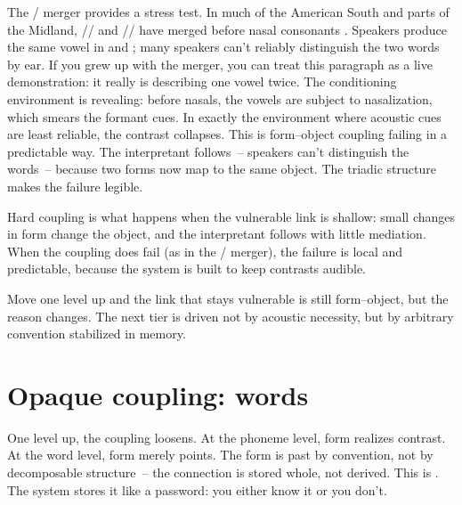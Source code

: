 The / merger provides a stress test. In much of the American South and parts of the Midland, // and // have merged before nasal consonants \parencite{labov2006}. Speakers produce the same vowel in  and ; many speakers can't reliably distinguish the two words by ear. If you grew up with the merger, you can treat this paragraph as a live demonstration: it really is describing one vowel twice. The conditioning environment is revealing: before nasals, the vowels are subject to nasalization, which smears the formant cues. In exactly the environment where acoustic cues are least reliable, the contrast collapses. This is form--object coupling failing in a predictable way. The interpretant follows~-- speakers can't distinguish the words~-- because two forms now map to the same object. The triadic structure makes the failure legible.

Hard coupling is what happens when the vulnerable link is shallow: small changes in form change the object, and the interpretant follows with little mediation. When the coupling does fail (as in the / merger), the failure is local and predictable, because the system is built to keep contrasts audible.

Move one level up and the link that stays vulnerable is still form--object, but the reason changes. The next tier is driven not by acoustic necessity, but by arbitrary convention stabilized in memory.

\section{Opaque coupling: words}
\label{sec:14:words}

One level up, the coupling loosens. At the phoneme level, form realizes contrast. At the word level, form merely points. The form  is past by convention, not by decomposable structure~-- the connection is stored whole, not derived. This is . The system stores it like a password: you either know it or you don't.

